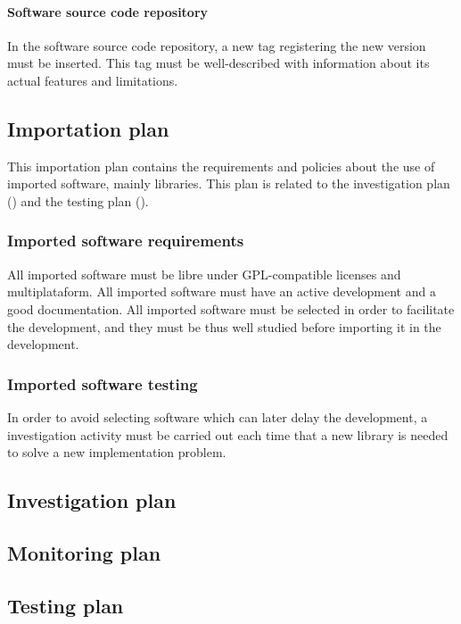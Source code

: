 \documentclass[twocolumn]{article}
\begin{document}
\paragraph{Software source code repository}
In the software source code repository, a new tag registering the new
version must be inserted. This tag must be well-described with
information about its actual features and limitations.

\subsection{Importation plan}
\label{ssec:importation-plan}
This importation plan contains the requirements and policies about the
use of imported software, mainly libraries. This plan is related to
the investigation plan () and the
testing plan ().

\subsubsection{Imported software requirements}
All imported software must be libre under GPL-compatible
licenses and multiplataform. All imported software must have an active
development and a good documentation. All imported software must be
selected in order to facilitate the development, and they must be thus
well studied before importing it in the \fav development.

\subsubsection{Imported software testing}
In order to avoid selecting software which can later delay the
development, a investigation activity must be carried out each time
that a new library is needed to solve a new implementation problem.

\subsection{Investigation plan}
\label{ssec:investigation-plan}

\subsection{Monitoring plan}
\label{ssec:monitoring-plan}

\subsection{Testing plan}
\label{ssec:testing-plan}
\end{document}
